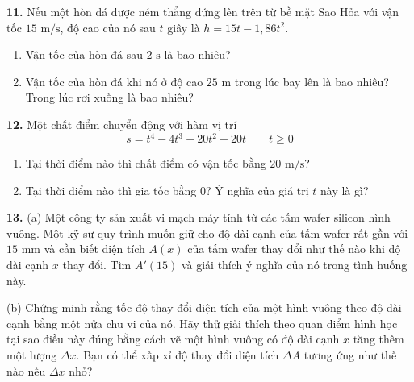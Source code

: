 \begin{minipage}[t]{0.48\textwidth}
    \vspace{5pt}
    \textbf{11.} Nếu một hòn đá được ném thẳng đứng lên trên từ bề mặt Sao Hỏa với vận tốc $15\text{ m/s}$, độ cao của nó sau $t$ giây là $h = 15t - 1{,}86t^2$.
    \begin{enumerate}[label=(\alph*), noitemsep, topsep=1.5pt, leftmargin=16pt]
        \item Vận tốc của hòn đá sau $2\text{ s}$ là bao nhiêu?
        \item Vận tốc của hòn đá khi nó ở độ cao $25\text{ m}$ trong lúc bay lên là bao nhiêu? Trong lúc rơi xuống là bao nhiêu?
    \end{enumerate}

    \vspace{5pt}
    \textbf{12.} Một chất điểm chuyển động với hàm vị trí
    \[
    s = t^4 - 4t^3 - 20t^2 + 20t \qquad t \ge 0
    \]
    \vspace{-6pt}
    \begin{enumerate}[label=(\alph*), noitemsep, topsep=1.5pt, leftmargin=16pt]
        \item Tại thời điểm nào thì chất điểm có vận tốc bằng $20\text{ m/s}$?
        \item Tại thời điểm nào thì gia tốc bằng $0$? Ý nghĩa của giá trị $t$ này là gì?
    \end{enumerate}

    \vspace{5pt}
    \textbf{13.} (a) Một công ty sản xuất vi mạch máy tính từ các tấm wafer silicon hình vuông. Một kỹ sư quy trình muốn giữ cho độ dài cạnh của tấm wafer rất gần với $15\text{ mm}$ và cần biết diện tích $A(x)$ của tấm wafer thay đổi như thế nào khi độ dài cạnh $x$ thay đổi. Tìm $A'(15)$ và giải thích ý nghĩa của nó trong tình huống này.\par
    \vspace{2pt}
    (b) Chứng minh rằng tốc độ thay đổi diện tích của một hình vuông theo độ dài cạnh bằng một nửa chu vi của nó. Hãy thử giải thích theo quan điểm hình học tại sao điều này đúng bằng cách vẽ một hình vuông có độ dài cạnh $x$ tăng thêm một lượng $\Delta x$. Bạn có thể xấp xỉ độ thay đổi diện tích $\Delta A$ tương ứng như thế nào nếu $\Delta x$ nhỏ?
\end{minipage}
